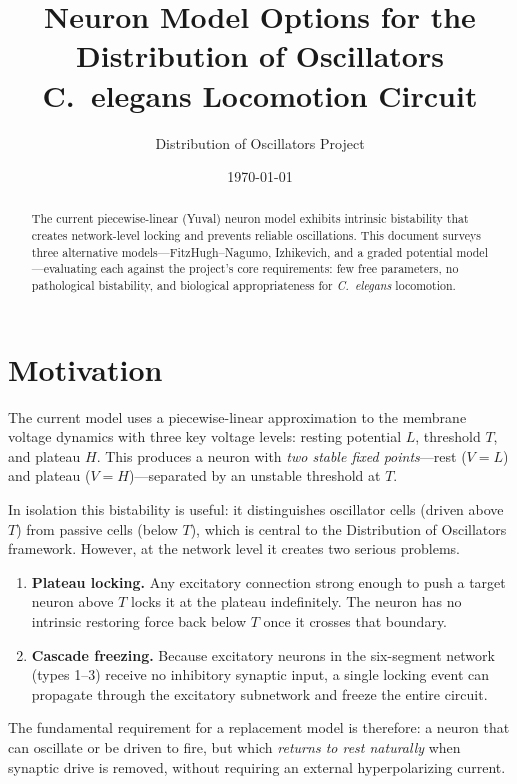 \documentclass[11pt]{article}
\title{Neuron Model Options for the Distribution of Oscillators\\
\large C.\ elegans Locomotion Circuit}
\author{Distribution of Oscillators Project}
\date{\today}
\begin{document}
\maketitle

\begin{abstract}
The current piecewise-linear (Yuval) neuron model exhibits intrinsic bistability that creates
network-level locking and prevents reliable oscillations. This document surveys three alternative
models---FitzHugh--Nagumo, Izhikevich, and a graded potential model---evaluating each against
the project's core requirements: few free parameters, no pathological bistability, and biological
appropriateness for \textit{C.~elegans} locomotion.
\end{abstract}

\section{Motivation}

The current model uses a piecewise-linear approximation to the membrane voltage dynamics with
three key voltage levels: resting potential $L$, threshold $T$, and plateau $H$.
This produces a neuron with \emph{two stable fixed points}---rest ($V = L$) and plateau
($V = H$)---separated by an unstable threshold at $T$.

In isolation this bistability is useful: it distinguishes oscillator cells (driven above $T$)
from passive cells (below $T$), which is central to the Distribution of Oscillators framework.
However, at the network level it creates two serious problems.

\begin{enumerate}
    \item \textbf{Plateau locking.} Any excitatory connection strong enough to push a target
          neuron above $T$ locks it at the plateau indefinitely. The neuron has no intrinsic
          restoring force back below $T$ once it crosses that boundary.
    \item \textbf{Cascade freezing.} Because excitatory neurons in the six-segment network
          (types 1--3) receive no inhibitory synaptic input, a single locking event can
          propagate through the excitatory subnetwork and freeze the entire circuit.
\end{enumerate}

The fundamental requirement for a replacement model is therefore: a neuron that can oscillate
or be driven to fire, but which \emph{returns to rest naturally} when synaptic drive is
removed, without requiring an external hyperpolarizing current.
\end{document}
